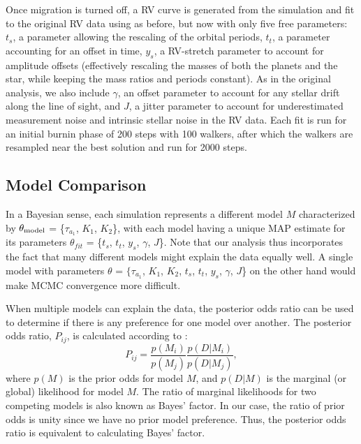 Once migration is turned off, a RV curve is generated from the simulation and fit to the original RV data using \emcee as before, but now with only five free parameters: 
$t_s$, a parameter allowing the rescaling of the orbital periods, 
$t_t$, a parameter accounting for an offset in time, 
$y_s$, a RV-stretch parameter to account for amplitude offsets (effectively rescaling the masses of both the planets and the star, while keeping the mass ratios and periods constant).
As in the original analysis, we also include  
$\gamma$, an offset parameter to account for any stellar drift along the line of sight, and 
$J$, a jitter parameter to account for underestimated measurement noise and intrinsic stellar noise in the RV data.
Each \emcee fit is run for an initial burnin phase of 200 steps with 100 walkers, after which the walkers are resampled near the best solution and run for 2000 steps. 


\subsection{Model Comparison}
\label{sec:MC}
In a Bayesian sense, each simulation represents a different model $M$ characterized by $\theta_{\rm model}$ = \{$\tau_{a_1}$, $K_1$, $K_2$\}, with each model having a unique MAP estimate for its parameters $\theta_{fit}$ = \{$t_s$, $t_t$, $y_s$, $\gamma$, $J$\}.
Note that our analysis thus incorporates the fact that many different models might explain the data equally well. 
A single model with parameters $\theta$ = $\{\tau_{a_1}$, $K_1$, $K_2$, $t_s$, $t_t$, $y_s$, $\gamma$, $J$\} on the other hand would make MCMC convergence more difficult. 

When multiple models can explain the data, the posterior odds ratio can be used to determine if there is any preference for one model over another. 
The posterior odds ratio, $P_{ij}$, is calculated according to \citep{Gregory2005}:
\begin{equation}
P_{ij} = \frac{p(M_i)}{p(M_j)} \frac{p(D|M_i)}{p(D|M_j)}, 
\label{eq:PO}
\end{equation}
where $p(M)$ is the prior odds for model $M$, and $p(D|M)$ is the marginal (or global) likelihood for model $M$.
The ratio of marginal likelihoods for two competing models is also known as Bayes' factor. 
In our case, the ratio of prior odds is unity since we have no prior model preference. 
Thus, the posterior odds ratio is equivalent to calculating Bayes' factor.

